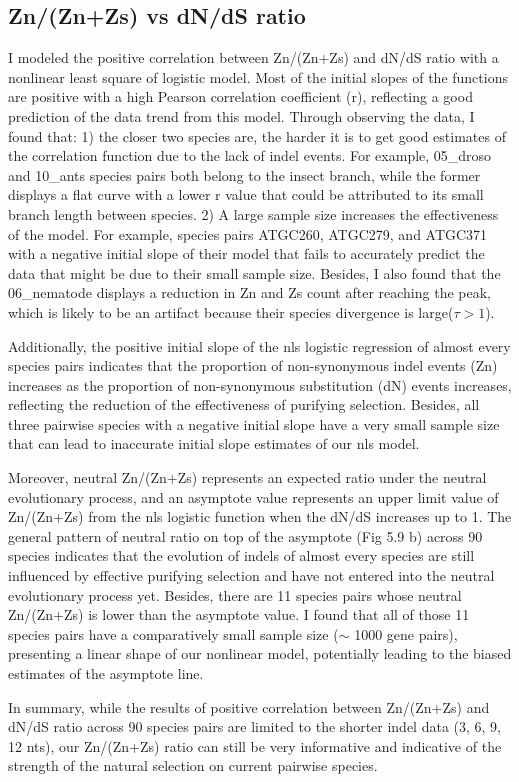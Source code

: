 \subsection{Zn/(Zn+Zs) vs dN/dS ratio}
I modeled the positive correlation between Zn/(Zn+Zs) and dN/dS ratio with a nonlinear least square of logistic model. Most of the initial slopes of the functions are positive with a high Pearson correlation coefficient (r), reflecting a good prediction of the data trend from this model. Through observing the data, I found that: 1) the closer two species are, the harder it is to get good estimates of the correlation function due to the lack of indel events. For example, 05\_droso and 10\_ants species pairs both belong to the insect branch, while the former displays a flat curve with a lower r value that could be attributed to its small branch length between species. 2) A large sample size increases the effectiveness of the model. For example, species pairs ATGC260, ATGC279, and ATGC371 with a negative initial slope of their model that fails to accurately predict the data that might be due to their small sample size. Besides, I also found that the 06\_nematode displays a reduction in Zn and Zs count after reaching the peak, which is likely to be an artifact because their species divergence is large($\tau>1$). 

Additionally, the positive initial slope of the nls logistic regression of almost every species pairs indicates that the proportion of non-synonymous indel events (Zn) increases as the proportion of non-synonymous substitution (dN) events increases, reflecting the reduction of the effectiveness of purifying selection. Besides, all three pairwise species with a negative initial slope have a very small sample size that can lead to inaccurate initial slope estimates of our nls model.  

Moreover, neutral Zn/(Zn+Zs) represents an expected ratio under the neutral evolutionary process, and an asymptote value represents an upper limit value of Zn/(Zn+Zs) from the nls logistic function when the dN/dS increases up to 1. The general pattern of neutral ratio on top of the asymptote (Fig 5.9 b) across 90 species indicates that the evolution of indels of almost every species are still influenced by effective purifying selection and have not entered into the neutral evolutionary process yet. Besides, there are 11 species pairs whose neutral Zn/(Zn+Zs) is lower than the asymptote value. I found that all of those 11 species pairs have a comparatively small sample size ($\sim$ 1000 gene pairs), presenting a linear shape of our nonlinear model, potentially leading to the biased estimates of the asymptote line.  

In summary, while the results of positive correlation between Zn/(Zn+Zs) and dN/dS ratio across 90 species pairs are limited to the shorter indel data (3, 6, 9, 12 nts), our Zn/(Zn+Zs) ratio can still be very informative and indicative of the strength of the natural selection on current pairwise species.  